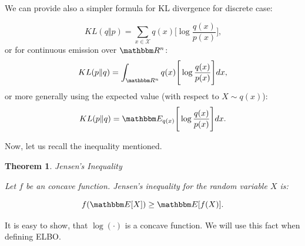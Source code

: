\documentclass[shortabstract]{iithesis}
\newtheorem{theorem}{Theorem}
\begin{document}
We can provide also a simpler formula for KL divergence for discrete case:

\begin{equation} \label{eq:kl_d}
    KL(q \Vert p) = \sum_{x \in \mathcal X} q(x) \Bigg[ \log \frac{q(x)}{p(x)} \Bigg] \text{,}
\end{equation}
or  for continuous emission over  $\mathbbm R^n$:
 \begin{equation*}
     KL(p \Vert q) = \int_{\mathbbm R^n} q(x) \Bigg[ \log \frac{q(x)}{p(x)} \Bigg] dx\text{,}
 \end{equation*}
or more generally using the expected value (with respect to $X \sim q(x)$):
\begin{equation*}
    KL(p \Vert q) = \mathbbm E_{q(x)} \Bigg[ \log \frac{q(x)}{p(x)} \Bigg] dx\text{.}
\end{equation*}

Now, let us recall the inequality mentioned.

\begin{theorem} {Jensen's Inequality}

Let $f$ be an concave function. Jensen's inequality for the random variable $X$ is:

\begin{equation*}
    f( \mathbbm E [X] ) \geq  \mathbbm E [f(X)] \text{.}
\end{equation*}
    
\end{theorem}

It is easy to show, that $\log(\cdot)$ is a concave function. We will use this fact when defining ELBO. 
\end{document}
